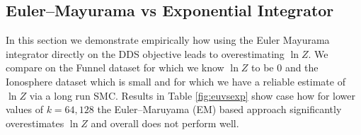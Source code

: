 \documentclass{article} %
\begin{document}
\subsection{Euler--Mayurama vs Exponential Integrator}

In this section we demonstrate empirically how using the Euler Mayurama integrator directly on the DDS objective leads to overestimating $\ln Z$. We compare on the Funnel dataset for which we know $\ln Z$ to be $0$ and the Ionosphere dataset which is small and for which we have a reliable estimate of $\ln Z$ via a long run SMC. Results in Table \ref{fig:euvsexp} show case how for lower values of $k=64,128$ the Euler--Maruyama (EM) based approach significantly overestimates $\ln Z$ and overall does not perform well.  

\begin{table}[]
\caption{Comparing EM vs Exponential integrators on Funnel and Ionosphere datasets. We can see how EM significantly overestimates $\ln Z$.\label{fig:euvsexp}}
\end{table}
\end{document}
